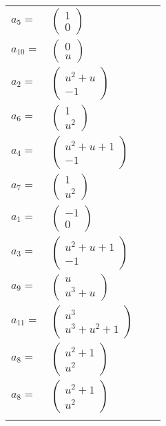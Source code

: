 \documentclass[1p]{elsarticle_modified}
\theoremstyle{definition}
\begin{document}
\begin{tabular}{m{7pt} m{180pt} m{7pt} m{180pt} }
\flushright $a_{5}=$&$\begin{pmatrix}1\\0\end{pmatrix}$ \\
\flushright $a_{10}=$&$\begin{pmatrix}0\\u\end{pmatrix}$ \\
\flushright $a_{2}=$&$\begin{pmatrix}u^2+u\\-1\end{pmatrix}$ \\
\flushright $a_{6}=$&$\begin{pmatrix}1\\u^2\end{pmatrix}$ \\
\flushright $a_{4}=$&$\begin{pmatrix}u^2+u+1\\-1\end{pmatrix}$ \\
\flushright $a_{7}=$&$\begin{pmatrix}1\\u^2\end{pmatrix}$ \\
\flushright $a_{1}=$&$\begin{pmatrix}-1\\0\end{pmatrix}$ \\
\flushright $a_{3}=$&$\begin{pmatrix}u^2+u+1\\-1\end{pmatrix}$ \\
\flushright $a_{9}=$&$\begin{pmatrix}u\\u^3+u\end{pmatrix}$ \\
\flushright $a_{11}=$&$\begin{pmatrix}u^3\\u^3+u^2+1\end{pmatrix}$ \\
\flushright $a_{8}=$&$\begin{pmatrix}u^2+1\\u^2\end{pmatrix}$\\ \flushright $a_{8}=$&$\begin{pmatrix}u^2+1\\u^2\end{pmatrix}$\\&\end{tabular}
\end{document}
